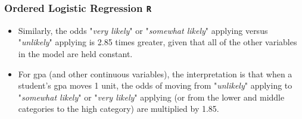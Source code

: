 \documentclass[00-GLMregslides.tex]{subfiles}
\begin{document}
\begin{frame}
		\frametitle{Ordered Logistic Regression \texttt{R} }
		\Large
\begin{itemize}
\item Similarly, the odds "\textit{very likely}" or "\textit{somewhat likely}" applying versus "\textit{unlikely}" applying is 2.85 times greater, 
given that all of the other variables in the model are held constant.
\item For gpa (and other continuous variables), the interpretation is that when a student's gpa moves 1 unit, 
the odds of moving from "\textit{unlikely}" applying to "\textit{somewhat likely}" or "\textit{very likely}" applying (or from the lower and middle categories to the high category) are multiplied by 1.85.
\end{itemize}
\end{frame}
\end{document}
